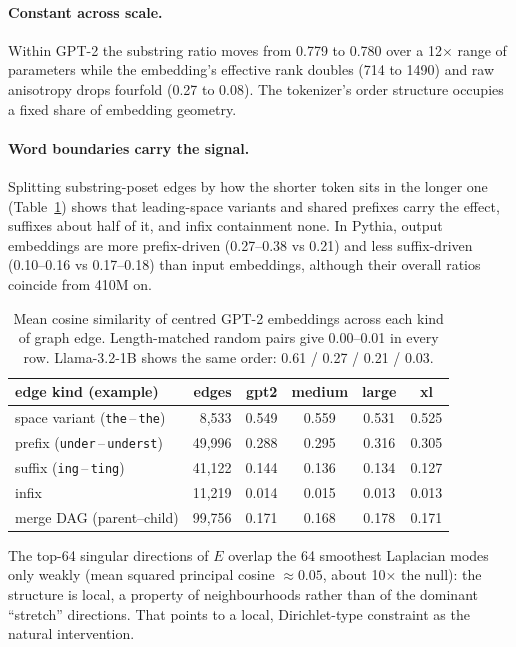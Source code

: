 \documentclass[11pt]{article}
\newcommand{\tok}[1]{\texttt{#1}}          %
\newcommand{\vsp}{\textvisiblespace}          %
\begin{document}
\paragraph{Constant across scale.} Within GPT-2 the substring ratio moves from 0.779
to 0.780 over a 12$\times$ range of parameters while the embedding's effective rank
doubles (714 to 1490) and raw anisotropy drops fourfold (0.27 to 0.08). The
tokenizer's order structure occupies a fixed share of embedding geometry.

\paragraph{Word boundaries carry the signal.} Splitting substring-poset edges by how
the shorter token sits in the longer one (Table~\ref{tab:edges}) shows that
leading-space variants and shared prefixes carry the effect, suffixes about half of
it, and infix containment none. In Pythia, output embeddings are more
prefix-driven (0.27--0.38 vs 0.21) and less suffix-driven (0.10--0.16 vs 0.17--0.18)
than input embeddings, although their overall ratios coincide from 410M on.

\begin{table}[t]
\centering
\small
\begin{tabular}{lrcccc}
\toprule
edge kind (example) & edges & gpt2 & medium & large & xl \\
\midrule
space variant (\tok{the}\,--\,\tok{\vsp the}) & 8{,}533  & 0.549 & 0.559 & 0.531 & 0.525 \\
prefix (\tok{under}\,--\,\tok{underst})     & 49{,}996 & 0.288 & 0.295 & 0.316 & 0.305 \\
suffix (\tok{ing}\,--\,\tok{ting})          & 41{,}122 & 0.144 & 0.136 & 0.134 & 0.127 \\
infix                                       & 11{,}219 & 0.014 & 0.015 & 0.013 & 0.013 \\
merge DAG (parent--child)                   & 99{,}756 & 0.171 & 0.168 & 0.178 & 0.171 \\
\bottomrule
\end{tabular}
\caption{Mean cosine similarity of centred GPT-2 embeddings across each kind of
graph edge. Length-matched random pairs give 0.00--0.01 in every row. Llama-3.2-1B
shows the same order: 0.61 / 0.27 / 0.21 / 0.03.}
\label{tab:edges}
\end{table}

The top-64 singular directions of $E$ overlap the 64 smoothest Laplacian modes only
weakly (mean squared principal cosine $\approx0.05$, about 10$\times$ the null): the
structure is local, a property of neighbourhoods rather than of the dominant
``stretch'' directions. That points to a local, Dirichlet-type constraint as the
natural intervention.
\end{document}
